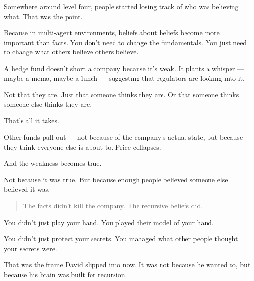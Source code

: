 Somewhere around level four, people started losing track of who was believing what.
That was the point.

Because in multi-agent environments, beliefs about beliefs become more important than facts.
You don’t need to change the fundamentals.
You just need to change what others believe others believe.

A hedge fund doesn’t short a company because it’s weak.
It plants a whisper — maybe a memo, maybe a lunch — suggesting that regulators are looking into it.

Not that they are.
Just that someone thinks they are.
Or that someone thinks someone else thinks they are.

That’s all it takes.

Other funds pull out — not because of the company’s actual state,
but because they think everyone else is about to.
Price collapses.

And the weakness becomes true.

Not because it was true.
But because enough people believed someone else believed it was.

\begin{quote}
The facts didn’t kill the company.
The recursive beliefs did.
\end{quote}

You didn’t just play your hand.
You played their model of your hand.

You didn’t just protect your secrets.
You managed what other people thought your secrets were.

That was the frame David slipped into now. It was not because he wanted to, but because his 
brain was built for recursion.

\medskip

